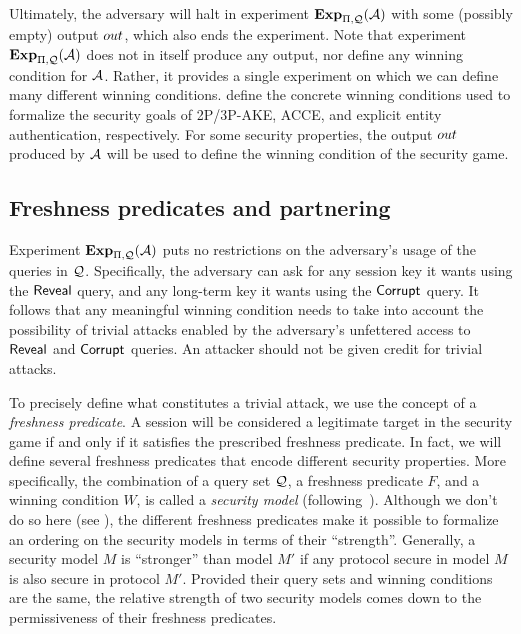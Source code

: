 \bigskip

Ultimately,
the adversary will halt in experiment $\mathbf{Exp}_{\mathrm{\Pi},\mathcal{Q}}^{}(\mathcal{A})$ with some (possibly empty) output $out$,
which also ends the experiment.
Note that experiment $\mathbf{Exp}_{\mathrm{\Pi},\mathcal{Q}}^{}(\mathcal{A})$ does not in itself produce any output,
nor define any winning condition for $\mathcal{A}$.
Rather, it provides a single experiment on which we can define many different winning conditions.
 define the concrete winning conditions used to formalize the security goals of 2P/3P-AKE, ACCE,
and explicit entity authentication,
respectively.
For some security properties,
the output $out$ produced by $\mathcal{A}$ will be used to define the winning condition of the security game.







\subsection{Freshness predicates and partnering}\label{sec:definitions:partnering}

Experiment $\mathbf{Exp}_{\mathrm{\Pi},\mathcal{Q}}^{}(\mathcal{A})$ puts no restrictions on the adversary's usage of the queries in $\mathcal{Q}$.
Specifically,
the adversary can ask for any session key it wants using the $\mathsf{Reveal}$ query, and any long-term key it wants using the $\mathsf{Corrupt}$ query.
It follows that any meaningful winning condition needs to take into account the possibility of trivial attacks enabled by the adversary's unfettered access to $\mathsf{Reveal}$ and $\mathsf{Corrupt}$ queries. 
An attacker should not be given credit for trivial attacks.

To precisely define what constitutes a trivial attack,
we use the concept of a \emph{freshness predicate}.
A session will be considered a legitimate target in the security game if
and only if
it satisfies the prescribed freshness predicate.
In fact,
we will define several freshness predicates that encode different security properties.
More specifically,
the combination of a query set $\mathcal{Q}$, 
a freshness predicate $F$,
and a winning condition $W$,
is called a \emph{security model} (following~\cite{ESORICS:CreFel12}).
Although we don't do so here (see \cite{ESORICS:CreFel12,EPRINT:FelCre14}),
the different freshness predicates make it possible to formalize an ordering on the security models in terms of their ``strength''.
Generally, a security model $M$ is ``stronger'' than model $M'$ if any protocol secure in model $M$ is also secure in protocol $M'$.
Provided their query sets and winning conditions are the same,
the relative strength of two security models comes down to the permissiveness of their freshness predicates.

